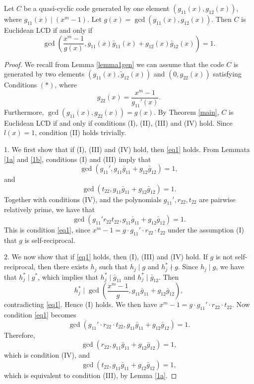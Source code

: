 \documentclass[a4paper,12pt]{article}
\begin{document}
 \begin{theorem} \label{main2}  Let $C$ be a quasi-cyclic code generated by one element $(g_{11}(x),g_{12}(x))$, where $g_{11}(x)\mid (x^m-1)$. Let $g(x)=\gcd(g_{11}(x),g_{12}(x))$. Then $C$ is Euclidean LCD if and only if 
  \begin{equation} \label{eq1}
  \gcd \left(\dfrac{x^m-1}{g(x)},  g_{11}(x)\bar{g}_{11}(x)+g_{12}(x) \bar{g}_{12}(x)\right)=1.
  \end{equation}
 \end{theorem}  
\begin{proof} We recall from  Lemma \ref{lemma1gen}   we can assume that the code $C$ is generated by two elements 
$
(g_{11}(x),\tilde{g}_{12}(x))
$
and $(0,g_{22}(x))$ satisfying Conditions  $(\ast)$,  where
\[
g_{22}(x)= \dfrac{x^m-1}{g_{11}'(x)}.
\]
Furthermore, $\gcd(g_{11}(x),g_{22}(x))=g(x)$.
By Theorem \ref{main}, $C$ is Euclidean LCD if and only if conditions (I), (II), (III) and (IV) hold. Since $l(x)=1$, condition (II) holds trivially. 

1. We first show that if (I), (III) and (IV) hold, then \eqref{eq1} holds.
From Lemmata \ref{1a} and \ref{1b}, conditions (I) and (III) imply that 
\[
\gcd \left( g_{11}',  g_{11}\bar{g}_{11}+g_{12} \bar{g}_{12}\right)=1,
\]
and
\[
\gcd \left( t_{22},  g_{11}\bar{g}_{11}+g_{12} \bar{g}_{12}\right)=1.
\]
Together with conditions (IV), and the polynomials $g_{11}', r_{22}, t_{22}$ are pairwise relatively prime, we have that
\[
\gcd \left( g_{11}' r_{22} t_{22},  g_{11}\bar{g}_{11}+g_{12} \bar{g}_{12}\right)=1.
\]
This is condition \eqref{eq1}, since $x^m-1 = g \cdot g_{11}' \cdot r_{22} \cdot t_{22}$ under the assumption (I) that $g$ is self-reciprocal.

2. We now show that if \eqref{eq1} holds, then (I), (III) and (IV) hold. If $g$ is not self-reciprocal, then    there exists $h_j$ such that $h_j\mid g$ and  $h_j^*  \nmid g$. Since $h_j \mid g$, we have that $h_j^* \mid g^*$, which implies that $h_j^* \mid \bar{g}_{11}$ and $h_j^* \mid \bar{g}_{12}$.
Then
\[
h_j^* \mid   \gcd \left(\dfrac{x^m-1}{g},  g_{11}\bar{g}_{11}+g_{12} \bar{g}_{12}\right),
\]
contradicting \eqref{eq1}. Hence (I) holds. 
We then have 
$
x^m-1  = g   \cdot g_{11}' \cdot r_{22} \cdot t_{22}.
$
Now condition \eqref{eq1} becomes
\[
\gcd \left( g_{11}' \cdot r_{22} \cdot t_{22},  g_{11}\bar{g}_{11}+g_{12} \bar{g}_{12}\right)=1.
\]
Therefore,
\[
\gcd \left(  r_{22},  g_{11}\bar{g}_{11}+g_{12} \bar{g}_{12}\right)=1,
\]
which is condition (IV), and 
\[
\gcd \left( t_{22},  g_{11}\bar{g}_{11}+g_{12} \bar{g}_{12}\right)=1,
\]
which is equivalent to condition (III),  by Lemma \ref{1a}.
\end{proof}
\end{document}
